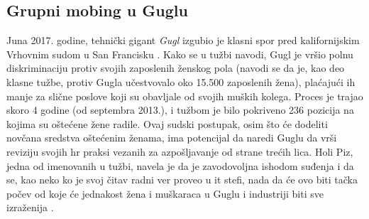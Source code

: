 \documentclass[a4paper]{article}
\begin{document}
    \subsection{Grupni mobing u Guglu}
    
    Juna 2017. godine, tehnički gigant \textit{Gugl} izgubio je klasni spor pred kalifornijskim Vrhovnim sudom u San Francisku \cite{ellisgoogle}. Kako se u tužbi navodi, Gugl je vršio polnu diskriminaciju protiv svojih zaposlenih ženskog pola (navodi se da je, kao deo klasne tužbe, protiv Gugla učestvovalo oko 15.500 zaposlenih žena), plaćajući ih manje za slične poslove koji su obavljale od svojih muških kolega. Proces je trajao skoro 4 godine (od septembra 2013.), i tužbom je bilo pokriveno 236 pozicija na kojima su oštećene žene radile. Ovaj sudski postupak, osim što će dodeliti novčana sredstva oštećenim ženama, ima potencijal da naredi Guglu da vrši reviziju svojih \acrshort{hr} praksi vezanih za azpošljavanje od strane trećih lica. Holi Piz, jedna od imenovanih u tužbi, navela je da je zavodovoljna ishodom suđenja i da se, kao neko ko je svoj čitav radni ver proveo u \acrshort{it} stefi, nada da će ovo biti tačka počev od koje će jednakost žena i muškaraca u Guglu i industriji biti sve izraženija \cite{juristgoogle}.
    
\end{document}
